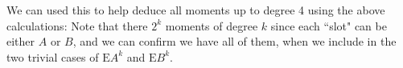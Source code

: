 We can used this to help deduce all moments up to degree 4 using the above calculations:
Note that there $2^k$ moments of degree $k$ since each ``slot" can be either $A$ or $B$, and we can confirm we have all of them, when we include in the two trivial cases of $\ensuremath{\bm{\mathrm{E}}}A^k$ and $\ensuremath{\bm{\mathrm{E}}}B^k$. 

